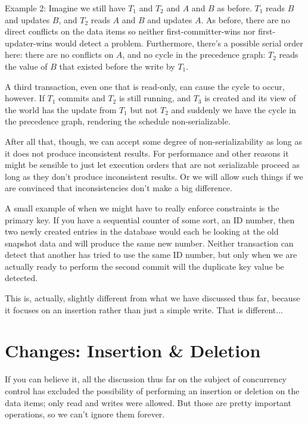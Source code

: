 \documentclass[a4paper]{report}
\begin{document}
Example 2: Imagine we still have $T_{1}$ and $T_{2}$ and $A$ and $B$ as before. $T_{1}$ reads $B$ and updates $B$, and $T_{2}$ reads $A$ and $B$ and updates $A$. As before, there are no direct conflicts on the data items so neither first-committer-wins nor first-updater-wins would detect a problem. Furthermore, there's a possible serial order here: there are no conflicts on $A$, and no cycle in the precedence graph: $T_{2}$ reads the value of $B$ that existed before the write by $T_{1}$. 

A third transaction, even one that is read-only, can cause the cycle to occur, however. If $T_{1}$ commits and $T_{2}$ is still running, and $T_{3}$ is created and its view of the world has the update from $T_{1}$ but not $T_{2}$ and suddenly we have the cycle in the precedence graph, rendering the schedule non-serializable.

After all that, though, we can accept some degree of non-serializability as long as it does not produce inconsistent results. For performance and other reasons it might be sensible to just let execution orders that are not serializable proceed as long as they don't produce inconsistent results.  Or we will allow such things if we are convinced that inconsistencies don't make a big difference. 

A small example of when we might have to really enforce constraints is the primary key. If you have a sequential counter of some sort, an ID number, then two newly created entries in the database would each be looking at the old snapshot data and will produce the same new number. Neither transaction can detect that another has tried to use the same ID number, but only when we are actually ready to perform the second commit will the duplicate key value be detected.

This is, actually, slightly different from what we have discussed thus far, because it focuses on an insertion rather than just a simple write. That is different...

\section*{Changes: Insertion \& Deletion}

If you can believe it, all the discussion thus far on the subject of concurrency control has excluded the possibility of performing an insertion or deletion on the data items; only read and writes were allowed. But those are pretty important operations, so we can't ignore them forever. 
\end{document}
